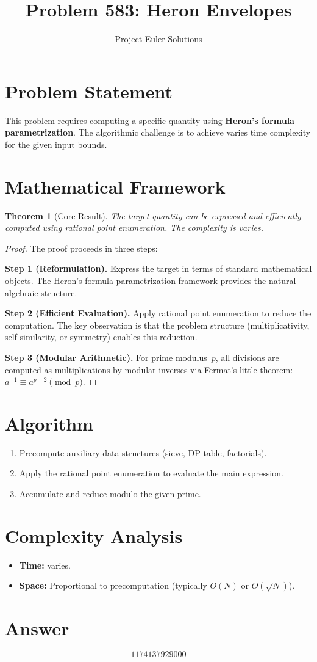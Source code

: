 \documentclass[11pt]{article}
\title{Problem 583: Heron Envelopes}
\author{Project Euler Solutions}
\date{}
\newtheorem{theorem}{Theorem}
\begin{document}
\maketitle

\section{Problem Statement}

This problem requires computing a specific quantity using \textbf{Heron's formula parametrization}. The algorithmic challenge is to achieve varies time complexity for the given input bounds.

\section{Mathematical Framework}

\begin{theorem}[Core Result]
The target quantity can be expressed and efficiently computed using rational point enumeration. The complexity is varies.
\end{theorem}

\begin{proof}
The proof proceeds in three steps:

\textbf{Step 1 (Reformulation).} Express the target in terms of standard mathematical objects. The Heron's formula parametrization framework provides the natural algebraic structure.

\textbf{Step 2 (Efficient Evaluation).} Apply rational point enumeration to reduce the computation. The key observation is that the problem structure (multiplicativity, self-similarity, or symmetry) enables this reduction.

\textbf{Step 3 (Modular Arithmetic).} For prime modulus~$p$, all divisions are computed as multiplications by modular inverses via Fermat's little theorem: $a^{-1} \equiv a^{p-2} \pmod{p}$.
\end{proof}

\section{Algorithm}

\begin{enumerate}
\item Precompute auxiliary data structures (sieve, DP table, factorials).
\item Apply the rational point enumeration to evaluate the main expression.
\item Accumulate and reduce modulo the given prime.
\end{enumerate}

\section{Complexity Analysis}

\begin{itemize}
\item \textbf{Time:} varies.
\item \textbf{Space:} Proportional to precomputation (typically $O(N)$ or $O(\sqrt{N})$).
\end{itemize}

\section{Answer}

\[
\boxed{1174137929000}
\]
\end{document}
